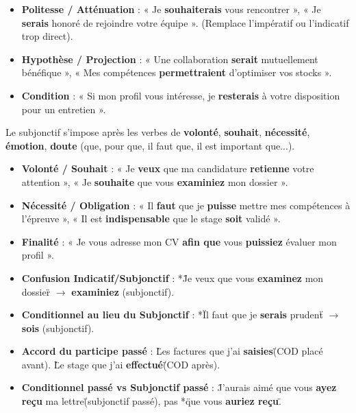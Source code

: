 \documentclass[11pt]{article}
\begin{document}
\begin{propriete}
\begin{itemize}
\item \textbf{Politesse / Atténuation} : « Je \textbf{souhaiterais} vous rencontrer », « Je \textbf{serais} honoré de rejoindre votre équipe ». (Remplace l'impératif ou l'indicatif trop direct).
\item \textbf{Hypothèse / Projection} : « Une collaboration \textbf{serait} mutuellement bénéfique », « Mes compétences \textbf{permettraient} d'optimiser vos stocks ».
\item \textbf{Condition} : « Si mon profil vous intéresse, je \textbf{resterais} à votre disposition pour un entretien ».
\end{itemize}
\end{propriete}

\begin{propriete}
Le subjonctif s'impose après les verbes de \textbf{volonté}, \textbf{souhait}, \textbf{nécessité}, \textbf{émotion}, \textbf{doute} (que, pour que, il faut que, il est important que...).
\begin{itemize}
\item \textbf{Volonté / Souhait} : « Je \textbf{veux} que ma candidature \textbf{retienne} votre attention », « Je \textbf{souhaite} que vous \textbf{examiniez} mon dossier ».
\item \textbf{Nécessité / Obligation} : « Il \textbf{faut} que je \textbf{puisse} mettre mes compétences à l'épreuve », « Il est \textbf{indispensable} que le stage \textbf{soit} validé ».
\item \textbf{Finalité} : « Je vous adresse mon CV \textbf{afin que} vous \textbf{puissiez} évaluer mon profil ».
\end{itemize}
\end{propriete}

\begin{attention}
\begin{itemize}
\item \textbf{Confusion Indicatif/Subjonctif} : *\"Je veux que vous \textbf{examinez} mon dossier\" $\to$ \textbf{examiniez} (subjonctif).
\item \textbf{Conditionnel au lieu du Subjonctif} : *\"Il faut que je \textbf{serais} prudent\" $\to$ \textbf{sois} (subjonctif).
\item \textbf{Accord du participe passé} : \"Les factures que j'ai \textbf{saisies}\" (COD placé avant). \"Le stage que j'ai \textbf{effectué}\" (COD après).
\item \textbf{Conditionnel passé vs Subjonctif passé} : \"J'aurais aimé que vous \textbf{ayez reçu} ma lettre\" (subjonctif passé), pas *\"que vous \textbf{auriez reçu}\".
\end{itemize}
\end{attention}
\end{document}
